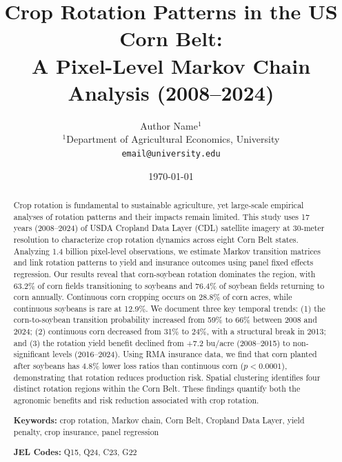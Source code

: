 \documentclass[12pt, a4paper]{article}
\title{
    \textbf{Crop Rotation Patterns in the US Corn Belt: \\
    A Pixel-Level Markov Chain Analysis (2008--2024)}
}
\author{
    Author Name$^{1}$ \\
    \small $^{1}$Department of Agricultural Economics, University \\
    \small \texttt{email@university.edu}
}
\date{\today}
\begin{document}
\maketitle


\begin{abstract}
\noindent
Crop rotation is fundamental to sustainable agriculture, yet large-scale empirical analyses of rotation patterns and their impacts remain limited. This study uses 17 years (2008--2024) of USDA Cropland Data Layer (CDL) satellite imagery at 30-meter resolution to characterize crop rotation dynamics across eight Corn Belt states. Analyzing 1.4 billion pixel-level observations, we estimate Markov transition matrices and link rotation patterns to yield and insurance outcomes using panel fixed effects regression. Our results reveal that corn-soybean rotation dominates the region, with 63.2\% of corn fields transitioning to soybeans and 76.4\% of soybean fields returning to corn annually. Continuous corn cropping occurs on 28.8\% of corn acres, while continuous soybeans is rare at 12.9\%. We document three key temporal trends: (1) the corn-to-soybean transition probability increased from 59\% to 66\% between 2008 and 2024; (2) continuous corn decreased from 31\% to 24\%, with a structural break in 2013; and (3) the rotation yield benefit declined from +7.2 bu/acre (2008--2015) to non-significant levels (2016--2024). Using RMA insurance data, we find that corn planted after soybeans has 4.8\% lower loss ratios than continuous corn ($p < 0.0001$), demonstrating that rotation reduces production risk. Spatial clustering identifies four distinct rotation regions within the Corn Belt. These findings quantify both the agronomic benefits and risk reduction associated with crop rotation.

\vspace{0.5cm}
\noindent\textbf{Keywords:} crop rotation, Markov chain, Corn Belt, Cropland Data Layer, yield penalty, crop insurance, panel regression

\noindent\textbf{JEL Codes:} Q15, Q24, C23, G22
\end{abstract}

\newpage

\end{document}
